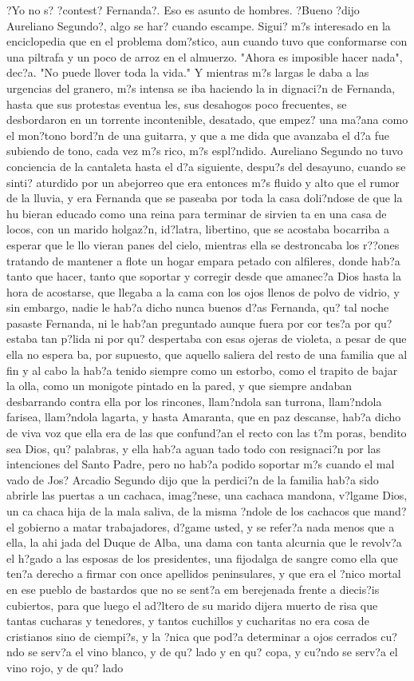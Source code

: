  ?Yo no s? ?contest? Fernanda?. Eso es asunto de hombres. ?Bueno ?dijo Aureliano Segundo?, algo se har? cuando escampe. Sigui? m?s interesado en la enciclopedia que en el problema dom?stico, aun cuando tuvo que conformarse con una piltrafa y un poco de arroz en el almuerzo. "Ahora es imposible hacer nada", dec?a. "No puede llover toda la vida." Y mientras m?s largas le daba a las urgencias del granero, m?s intensa se iba haciendo la in dignaci?n de Fernanda, hasta que sus protestas eventua les, sus desahogos poco frecuentes, se desbordaron en un torrente incontenible, desatado, que empez? una ma?ana como el mon?tono bord?n de una guitarra, y que a me dida que avanzaba el d?a fue subiendo de tono, cada vez m?s rico, m?s espl?ndido. Aureliano Segundo no tuvo conciencia de la cantaleta hasta el d?a siguiente, despu?s del desayuno, cuando se sinti? aturdido por un abejorreo que era entonces m?s fluido y alto que el rumor de la lluvia, y era Fernanda que se paseaba por toda la casa doli?ndose de que la hu bieran educado como una reina para terminar de sirvien ta en una casa de locos, con un marido holgaz?n, id?latra, libertino, que se acostaba bocarriba a esperar que le llo vieran panes del cielo, mientras ella se destroncaba los r??ones tratando de mantener a flote un hogar empara petado con alfileres, donde hab?a tanto que hacer, tanto que soportar y corregir desde que amanec?a Dios hasta la hora de acostarse, que llegaba a la cama con los ojos llenos de polvo de vidrio, y sin embargo, nadie le hab?a dicho nunca buenos d?as Fernanda, qu? tal noche pasaste Fernanda, ni le hab?an preguntado aunque fuera por cor tes?a por qu? estaba tan p?lida ni por qu? despertaba con esas ojeras de violeta, a pesar de que ella no espera ba, por supuesto, que aquello saliera del resto de una familia que al fin y al cabo la hab?a tenido siempre como un estorbo, como el trapito de bajar la olla, como un monigote pintado en la pared, y que siempre andaban desbarrando contra ella por los rincones, llam?ndola san turrona, llam?ndola farisea, llam?ndola lagarta, y hasta Amaranta, que en paz descanse, hab?a dicho de viva voz que ella era de las que confund?an el recto con las t?m poras, bendito sea Dios, qu? palabras, y ella hab?a aguan tado todo con resignaci?n por las intenciones del Santo Padre, pero no hab?a podido soportar m?s cuando el mal vado de Jos? Arcadio Segundo dijo que la perdici?n de la familia hab?a sido abrirle las puertas a un cachaca, imag?nese, una cachaca mandona, v?lgame Dios, un ca chaca hija de la mala saliva, de la misma ?ndole de los cachacos que mand? el gobierno a matar trabajadores, d?game usted, y se refer?a nada menos que a ella, la ahi jada del Duque de Alba, una dama con tanta alcurnia que le revolv?a el h?gado a las esposas de los presidentes, una fijodalga de sangre como ella que ten?a derecho a firmar con once apellidos peninsulares, y que era el ?nico mortal en ese pueblo de bastardos que no se sent?a em berejenada frente a diecis?is cubiertos, para que luego el ad?ltero de su marido dijera muerto de risa que tantas cucharas y tenedores, y tantos cuchillos y cucharitas no era cosa de cristianos sino de ciempi?s, y la ?nica que pod?a determinar a ojos cerrados cu?ndo se serv?a el vino blanco, y de qu? lado y en qu? copa, y cu?ndo se serv?a el vino rojo, y de qu? lado 